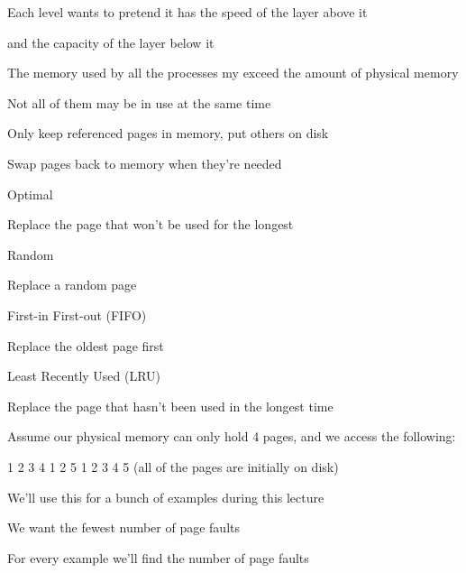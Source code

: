 \begin{slide}


    Each level wants to pretend it has the speed of the layer above it

    \leftspace{}and the capacity of the layer below it
    \medskip

    The memory used by all the processes my exceed the amount of physical memory

    \leftspace{}Not all of them may be in use at the same time
    \medskip

    Only keep referenced pages in memory, put others on disk

    \leftspace{}Swap pages back to memory when they're needed

\end{slide}

\begin{slide}


    Optimal

    \leftspace{}Replace the page that won't be used for the longest
    \medskip

    Random

    \leftspace{}Replace a random page
    \medskip

    First-in First-out (FIFO)

    \leftspace{}Replace the oldest page first
    \medskip

    Least Recently Used (LRU)

    \leftspace{}Replace the page that hasn't been used in the longest time

\end{slide}

\begin{slide}


    Assume our physical memory can only hold 4 pages, and we access the following:

    \leftspace{}1 2 3 4 1 2 5 1 2 3 4 5 (all of the pages are initially on disk)
    \medskip

    We'll use this for a bunch of examples during this lecture

    \leftspace{}We want the fewest number of page faults
    \medskip

    For every example we'll find the number of page faults

\end{slide}

